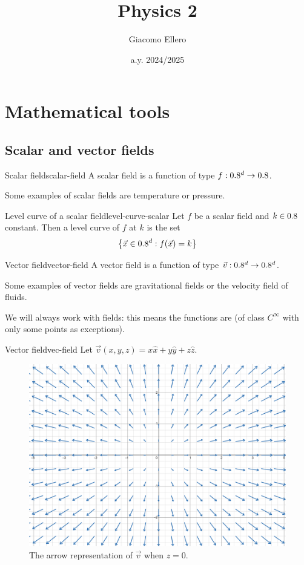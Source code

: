 \documentclass[12pt]{extarticle}
\title{Physics 2}
\author{Giacomo Ellero}
\date{a.y. 2024/2025}
\begin{document}
\firstpage

\section{Mathematical tools}

\subsection{Scalar and vector fields}

\begin{definition}{Scalar field}{scalar-field}
    A scalar field is a function of type $f:0.8^d \to 0.8$.
\end{definition}

Some examples of scalar fields are temperature or pressure.

\begin{definition}{Level curve of a scalar field}{level-curve-scalar}
    Let $f$ be a scalar field and $k \in 0.8$ constant.
    Then a level curve of $f$ at $k$ is the set
    \begin{equation}
        \left\{ \vec x \in 0.8^d : f(\vec x) = k  \right\}
    \end{equation}
\end{definition}


\begin{definition}{Vector field}{vector-field}
    A vector field is a function of type $\vec v: 0.8^d \to 0.8^d$.
\end{definition}

Some examples of vector fields are gravitational fields or the velocity field of fluids.

We will always work with  fields: this means the functions are  (of class $C^\infty$ with only some points as exceptions).

\begin{example}{Vector field}{vec-field}
    Let $\vec v(x, y, z) = x \hat x + y \hat y + z \hat z$.

    \begin{figure}[H]
        \centering
        \includegraphics[height=0.4\textwidth]{assets/physics-2/vector-field-example.png}
        \caption{The arrow representation of $\vec v$ when $z = 0$.}
        \label{fig:field_source_0}
    \end{figure}
\end{example}
\end{document}

